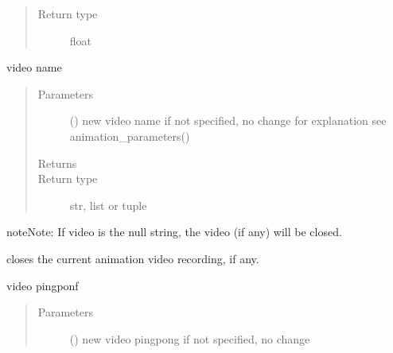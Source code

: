\documentclass[letterpaper,10pt,english]{sphinxmanual}
\begin{document}
\begin{fulllineitems}
\begin{fulllineitems}
\begin{quote}
\begin{description}
\item[{Return type}] \leavevmode
float

\end{description}\end{quote}

\end{fulllineitems}


\begin{fulllineitems}
\label{\detokenize{Reference:salabim.Environment.video}}
video name
\begin{quote}\begin{description}
\item[{Parameters}] \leavevmode
{} (\sphinxstyleliteralemphasis{, }) \textendash{} new video name 
if not specified, no change 
for explanation see animation\_parameters()

\item[{Returns}] \leavevmode
{}

\item[{Return type}] \leavevmode
str, list or tuple

\end{description}\end{quote}

\begin{sphinxadmonition}{note}{Note:}
If video is the null string, the video (if any) will be closed.
\end{sphinxadmonition}

\end{fulllineitems}


\begin{fulllineitems}
\label{\detokenize{Reference:salabim.Environment.video_close}}
closes the current animation video recording, if any.

\end{fulllineitems}


\begin{fulllineitems}
\label{\detokenize{Reference:salabim.Environment.video_pingpong}}
video pingponf
\begin{quote}\begin{description}
\item[{Parameters}] \leavevmode
{} () \textendash{} new video pingpong 
if not specified, no change


\end{description}
\end{quote}
\end{fulllineitems}
\end{fulllineitems}
\end{document}
